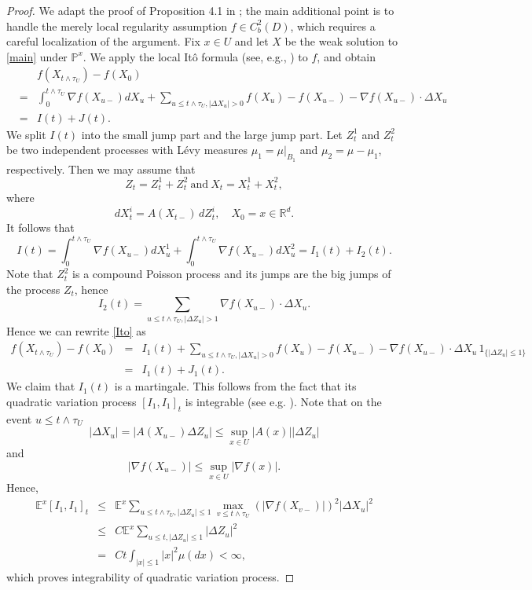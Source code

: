 \documentclass[a4paper,12pt,reqno]{amsart}
\theoremstyle{definition}
\theoremstyle{remark}
\newcommand{\Ee}{\mathds{E}} %
\newcommand{\Pp}{\mathds{P}} %
\newcommand{\R}{\mathds{R}}
\begin{document}
\begin{proof} We adapt the proof of Proposition 4.1 in \cite{BC2006}; the main additional point is to handle the merely local regularity assumption $f\in C_b^2(D)$, which requires a careful localization of the argument. Fix $x\in U$ and let $X$ be the weak solution to \eqref{main} under $\Pp^x$.
We apply the local It\^o formula (see, e.g., \cite[Lemma 3.8]{BKP2025}) to $f$, and obtain
\begin{eqnarray}
\nonumber
&& f(X_{t \wedge \tau_{U}} )-f(X_{0})\\
\nonumber
&=& 
\int_0^{t\wedge \tau_{U}}\nabla f(X_{u-})dX_u+\sum_{u\le t\wedge \tau_{U}, |\Delta X_u|>0 }f(X_{u} )-f(X_{{u-}})-\nabla f(X_{u-})\cdot\Delta X_u\\
\label{Ito}
&=& I(t)+J(t).\end{eqnarray}
We split $I(t)$ into the small jump part and the large jump part. Let $Z^1_t$ and $Z^2_t$ be two independent processes with L\'evy measures $\mu_1 = \mu|_{B_1}$ and $\mu_2=\mu-\mu_1$, respectively. Then we may assume that
$$Z_t= Z^1_t+Z^2_t \
\text{and}  \
X_t= X^1_t+X^2_t,
$$
where
\begin{equation}
\label{main2}
dX^i_t = A(X_{t-}) \, dZ^i_t, \quad X_0 = x \in \R^d.
\end{equation}
It follows that 
$$I(t)= \int_0^{t\wedge \tau_{U}}\nabla f(X_{u-})dX^1_u+ \int_0^{t\wedge \tau_{U}}\nabla f(X_{u-})dX^2_u=I_1(t)+I_2(t).$$
Note that $Z_t^2$ is a compound Poisson process and its jumps are the big jumps of the process $Z_t$, hence 
 $$I_2(t) =\sum_{u\le t\wedge \tau_{U}, |\Delta Z_u|> 1 }\nabla f(X_{u-})\cdot\Delta X_u.$$
Hence we can rewrite \eqref{Ito} as 
\begin{eqnarray}\label{Ito1}f(X_{t \wedge \tau_{U}} )-f(X_{0})&=& 
I_1(t)+\sum_{u\le t\wedge \tau_{U}, |\Delta X_u|>0 }f(X_{u} )-f(X_{{u-}})-\nabla f(X_{u-})\cdot\Delta X_u \, 1_{\{|\Delta Z_u|\le 1\}}\nonumber\\&=& I_1(t)+J_1(t).\end{eqnarray}
We claim that $I_1(t)$ is a martingale. This follows from the fact that its quadratic variation process $[I_1, I_1]_t$ is integrable (see e.g. \cite[Corollary 3, p.73]{P2005} ). Note that on the event  $u\le t\wedge \tau_{U} $
$$|\Delta X_u|=  |A(X_{u-}) \Delta Z_u|\le \sup_{x\in U} |A(x)||\Delta Z_u| $$  and
$$|\nabla f(X_{u-})|\le \sup_{x\in U}|\nabla f(x)|.$$
Hence,
\begin{eqnarray*}\Ee^x[I_1, I_1]_t&\le& \Ee^x\sum_{u\le t\wedge \tau_{U}, |\Delta Z_u|\le 1 } \max_{v\le t\wedge \tau_{U}}(|\nabla f(X_{v-})|)^2|\Delta X_u|^2\\
&\le& C \Ee^x\sum_{u\le t, |\Delta Z_u|\le 1 } |\Delta Z_u|^2\\
&=& Ct\int_{|x|\le 1} |x|^2\mu(dx)<\infty, \end{eqnarray*}
 which proves integrability of quadratic variation process.


\end{proof}
\end{document}
